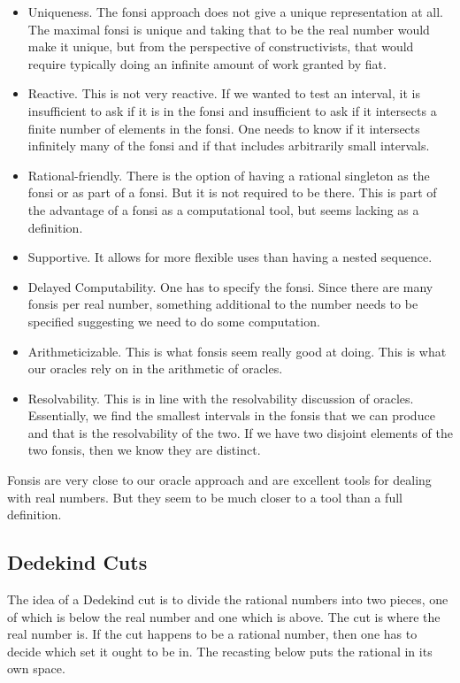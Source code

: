 \documentclass[12pt]{article}
\begin{document}
\begin{itemize}
    \item Uniqueness. The fonsi approach does not give a unique representation at all. The maximal fonsi is unique and taking that to be the real number would make it unique, but from the perspective of constructivists, that would require typically doing an infinite amount of work granted by fiat. 
    \item Reactive. This is not very reactive. If we wanted to test an interval, it is insufficient to ask if it is in the fonsi and insufficient to ask if it intersects a finite number of elements in the fonsi. One needs to know if it intersects infinitely many of the fonsi and if that includes arbitrarily small intervals. 
    \item Rational-friendly. There is the option of having a rational singleton as the fonsi or as part of a fonsi. But it is not required to be there. This is part of the advantage of a fonsi as a computational tool, but seems lacking as a definition. 
    \item Supportive. It allows for more flexible uses than having a nested sequence.
    \item Delayed Computability. One has to specify the fonsi. Since there are many fonsis per real number, something additional to the number needs to be specified suggesting we need to do some computation.
    \item Arithmeticizable. This is what fonsis seem really good at doing. This is what our oracles rely on in the arithmetic of oracles. 
    \item Resolvability. This is in line with the resolvability discussion of oracles. Essentially, we find the smallest intervals in the fonsis that we can produce and that is the resolvability of the two. If we have two disjoint elements of the two fonsis, then we know they are distinct. 
\end{itemize}

Fonsis are very close to our oracle approach and are excellent tools for dealing with real numbers. But they seem to be much closer to a tool than a full definition.
  
\subsection{Dedekind Cuts}

The idea of a Dedekind cut is to divide the rational numbers into two pieces, one of which is below the real number and one which is above. The cut is where the real number is. If the cut happens to be a rational number, then one has to decide which set it ought to be in. The recasting below puts the rational in its own space. 
\end{document}
